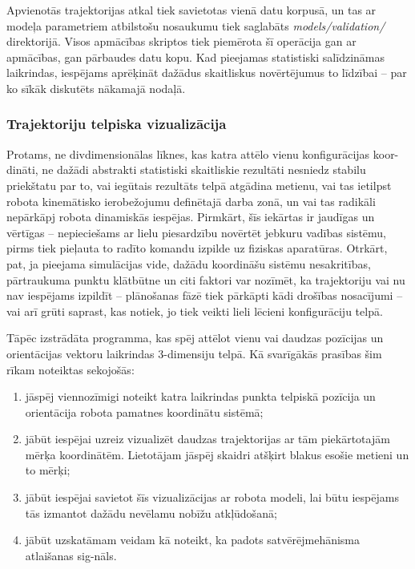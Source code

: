 \documentclass[12pt, a4paper]{article}
\numberwithin{equation}{section} %
\begin{document}
Apvienotās trajektorijas atkal tiek savietotas vienā datu korpusā, un tas ar modeļa parametriem atbilstošu nosaukumu tiek saglabāts \textit{models/validation/} direktorijā. Visos apmācības skriptos tiek piemērota šī operācija gan ar apmācības, gan pārbaudes datu kopu. Kad pieejamas statistiski salīdzināmas laikrindas, iespējams aprēķināt dažādus skaitliskus novērtējumus to līdzībai -- par ko sīkāk diskutēts nākamajā nodaļā.

\subsubsection{Trajektoriju telpiska vizualizācija}

Protams, ne divdimensionālas līknes, kas katra attēlo vienu konfigurācijas koor-dināti, ne dažādi abstrakti statistiski skaitliskie rezultāti nesniedz stabilu priekštatu par to, vai iegūtais rezultāts telpā atgādina metienu, vai tas ietilpst robota kinemātisko ierobežojumu definētajā darba zonā, un vai tas radikāli nepārkāpj robota dinamiskās iespējas. Pirmkārt, šīs iekārtas ir jaudīgas un vērtīgas -- nepieciešams ar lielu piesardzību novērtēt jebkuru vadības sistēmu, pirms tiek pieļauta to radīto komandu izpilde uz fiziskas aparatūras. Otrkārt, pat, ja pieejama simulācijas vide, dažādu koordināšu sistēmu nesakritības, pārtraukuma punktu klātbūtne un citi faktori var nozīmēt, ka trajektoriju vai nu nav iespējams izpildīt -- plānošanas fāzē tiek pārkāpti kādi drošības nosacījumi -- vai arī grūti saprast, kas notiek, jo tiek veikti lieli lēcieni konfigurāciju telpā.

Tāpēc izstrādāta programma, kas spēj attēlot vienu vai daudzas pozīcijas un orientācijas vektoru laikrindas 3-dimensiju telpā. Kā svarīgākās prasības šim rīkam noteiktas sekojošās:

\begin{enumerate}
    \item jāspēj viennozīmigi noteikt katra laikrindas punkta telpiskā pozīcija un orientācija robota pamatnes koordinātu sistēmā;
    \item jābūt iespējai uzreiz vizualizēt daudzas trajektorijas ar tām piekārtotajām mērķa koordinātēm. Lietotājam jāspēj skaidri atšķirt blakus esošie metieni un to mērķi;
    \item jābūt iespējai savietot šīs vizualizācijas ar robota modeli, lai būtu iespējams tās izmantot dažādu nevēlamu nobīžu atkļūdošanā;
    \item jābūt uzskatāmam veidam kā noteikt, ka padots satvērējmehānisma atlaišanas sig-nāls.
\end{enumerate}
\end{document}
